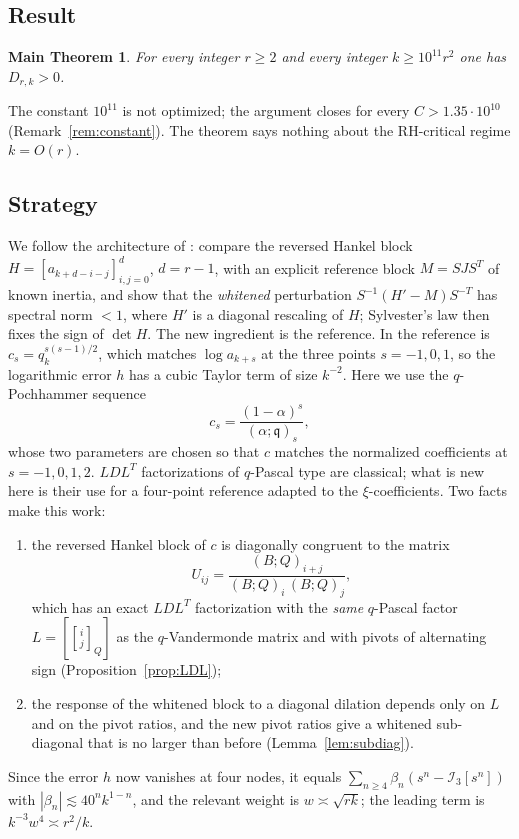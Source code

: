 \documentclass[11pt,a4paper]{article}
\numberwithin{equation}{section}
\newtheorem*{mainthm}{Main Theorem}
\theoremstyle{definition}
\theoremstyle{remark}
\newcommand{\qq}{\mathfrak q}
\newcommand{\cI}{\mathcal I}
\newcommand{\qbin}[3]{\genfrac{[}{]}{0pt}{}{#1}{#2}_{#3}}
\begin{document}
\subsection{Result}
\begin{mainthm}
For every integer $r\ge2$ and every integer $k\ge10^{11}r^2$ one has $D_{r,k}>0$.
\end{mainthm}

The constant $10^{11}$ is not optimized; the argument closes for every $C>1.35\cdot10^{10}$
(Remark~\ref{rem:constant}). The theorem says nothing about the RH-critical regime $k=O(r)$.

\subsection{Strategy}
We follow the architecture of \cite{Mich}: compare the reversed Hankel block
$H=[a_{k+d-i-j}]_{i,j=0}^{d}$, $d=r-1$, with an explicit reference block $M=SJS^T$ of known
inertia, and show that the \emph{whitened} perturbation $S^{-1}(H'-M)S^{-T}$ has spectral norm $<1$, where
$H'$ is a diagonal rescaling of $H$; Sylvester's law then fixes the sign of $\det H$.
The new ingredient is the reference. In \cite{Mich} the reference is $c_s=q_k^{s(s-1)/2}$, which matches
$\log a_{k+s}$ at the three points $s=-1,0,1$, so the logarithmic error $h$ has a cubic Taylor term of size
$k^{-2}$. Here we use the $q$-Pochhammer sequence
\[
c_s=\frac{(1-\alpha)^s}{(\alpha;\qq)_s},
\]
whose two parameters are chosen so that $c$ matches the normalized coefficients at $s=-1,0,1,2$. $LDL^T$ factorizations of $q$-Pascal type are classical; what is new here is their use for a four-point reference adapted to the $\xi$-coefficients. Two facts make
this work:
\begin{enumerate}
\item the reversed Hankel block of $c$ is diagonally congruent to the matrix
\[U_{ij}=\frac{(B;Q)_{i+j}}{(B;Q)_i\,(B;Q)_j},\]
which has an exact $LDL^T$ factorization with the \emph{same} $q$-Pascal factor $L=[\qbin ij{Q}]$ as the
$q$-Vandermonde matrix and with pivots of alternating sign (Proposition~\ref{prop:LDL});
\item the response of the whitened block to a diagonal dilation depends only on $L$ and on the pivot ratios, and the
new pivot ratios give a whitened sub-diagonal that is no larger than before (Lemma~\ref{lem:subdiag}).
\end{enumerate}
Since the error $h$ now vanishes at four nodes, it equals $\sum_{n\ge4}\beta_n(s^n-\cI_3[s^n])$
with $|\beta_n|\lesssim 40^nk^{1-n}$, and the relevant weight is $w\asymp\sqrt{rk}$; the leading term is
$k^{-3}w^4\asymp r^2/k$.
\end{document}
